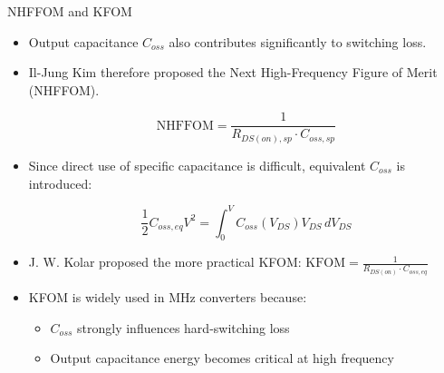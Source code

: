 \begin{frame}{NHFFOM and KFOM}
\begin{itemize}
    \item Output capacitance $C_{oss}$ also contributes significantly to switching loss.
    \item Il-Jung Kim therefore proposed the Next High-Frequency Figure of Merit (NHFFOM).

    \[
    \text{NHFFOM}
    =
    \frac{1}{R_{DS(on),sp}\cdot C_{oss,sp}}
    \]

    \item Since direct use of specific capacitance is difficult, equivalent $C_{oss}$ is introduced:

    \[
    \frac{1}{2}C_{oss,eq}V^2
    =
    \int_0^V C_{oss}(V_{DS})V_{DS}\,dV_{DS}
    \]

    \item J. W. Kolar proposed the more practical KFOM: $\text{KFOM}
    =
    \frac{1}{R_{DS(on)}\cdot C_{oss,eq}}$

    \item KFOM is widely used in MHz converters because:
    \begin{itemize}
        \item $C_{oss}$ strongly influences hard-switching loss
        \item Output capacitance energy becomes critical at high frequency
    \end{itemize}
\end{itemize}
\end{frame}




